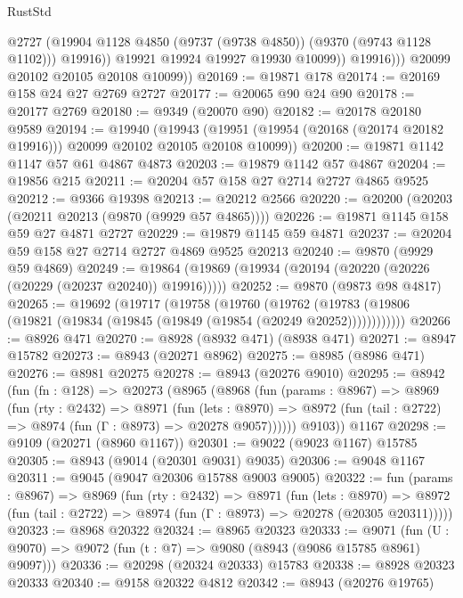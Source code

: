 \begin{lexlean}{RustStd}
\begin{coremodule}
                      @2727
                      (@19904 @1128 @4850 (@9737 (@9738 @4850)) (@9370 (@9743 @1128 @1102)))
                      @19916))
                  @19921
                  @19924
                  @19927
                  @19930
                  @10099))
              @19916)))
        @20099
        @20102
        @20105
        @20108
        @10099))
@20169 := @19871 @178
@20174 := @20169 @158 @24 @27 @2769 @2727
@20177 := @20065 @90 @24 @90
@20178 := @20177 @2769
@20180 := @9349 (@20070 @90)
@20182 := @20178 @20180 @9589
@20194 := @19940
    (@19943 (@19951 (@19954 (@20168 (@20174 @20182 @19916))) @20099 @20102 @20105 @20108 @10099))
@20200 := @19871 @1142 @1147 @57 @61 @4867 @4873
@20203 := @19879 @1142 @57 @4867
@20204 := @19856 @215
@20211 := @20204 @57 @158 @27 @2714 @2727 @4865 @9525
@20212 := @9366 @19398
@20213 := @20212 @2566
@20220 := @20200 (@20203 (@20211 @20213 (@9870 (@9929 @57 @4865))))
@20226 := @19871 @1145 @158 @59 @27 @4871 @2727
@20229 := @19879 @1145 @59 @4871
@20237 := @20204 @59 @158 @27 @2714 @2727 @4869 @9525 @20213
@20240 := @9870 (@9929 @59 @4869)
@20249 := @19864 (@19869 (@19934 (@20194 (@20220 (@20226 (@20229 (@20237 @20240)) @19916)))))
@20252 := @9870 (@9873 @98 @4817)
@20265 := @19692
    (@19717
      (@19758
        (@19760
          (@19762 (@19783 (@19806 (@19821 (@19834 (@19845 (@19849 (@19854 (@20249 @20252))))))))))))
@20266 := @8926 @471
@20270 := @8928 (@8932 @471) (@8938 @471)
@20271 := @8947 @15782
@20273 := @8943 (@20271 @8962)
@20275 := @8985 (@8986 @471)
@20276 := @8981 @20275
@20278 := @8943 (@20276 @9010)
@20295 := @8942
    (fun (fn : @128) =>
    @20273
      (@8965
        (@8968
          (fun (params : @8967) =>
          @8969
            (fun (rty : @2432) =>
            @8971
              (fun (lets : @8970) =>
              @8972 (fun (tail : @2722) => @8974 (fun (Γ : @8973) => @20278 @9057))))))
        @9103))
    @1167
@20298 := @9109 (@20271 (@8960 @1167))
@20301 := @9022 (@9023 @1167) @15785
@20305 := @8943 (@9014 (@20301 @9031) @9035)
@20306 := @9048 @1167
@20311 := @9045 (@9047 @20306 @15788 @9003 @9005)
@20322 := fun (params : @8967) =>
  @8969
    (fun (rty : @2432) =>
    @8971
      (fun (lets : @8970) =>
      @8972 (fun (tail : @2722) => @8974 (fun (Γ : @8973) => @20278 (@20305 @20311)))))
@20323 := @8968 @20322
@20324 := @8965 @20323
@20333 := @9071
    (fun (U : @9070) => @9072 (fun (t : @7) => @9080 (@8943 (@9086 @15785 @8961) @9097)))
@20336 := @20298 (@20324 @20333) @15783
@20338 := @8928 @20323 @20333
@20340 := @9158 @20322 @4812
@20342 := @8943 (@20276 @19765)

\end{coremodule}
\end{lexlean}
